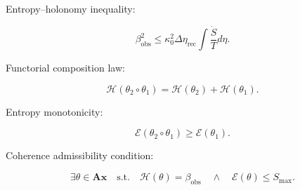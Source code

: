 \documentclass[12pt]{article}
\begin{document}
Entropy--holonomy inequality:

\begin{equation}
\beta_{\mathrm{obs}}^2
\le
\kappa_0^2
\Delta\eta_{\mathrm{rec}}
\int \frac{\dot{S}}{T} d\eta.
\end{equation}

Functorial composition law:

\begin{equation}
\mathcal{H}(\theta_2\circ\theta_1)
=
\mathcal{H}(\theta_2)
+
\mathcal{H}(\theta_1).
\end{equation}

Entropy monotonicity:

\begin{equation}
\mathcal{E}(\theta_2\circ\theta_1)
\ge
\mathcal{E}(\theta_1).
\end{equation}

Coherence admissibility condition:

\begin{equation}
\exists \theta \in \mathbf{Ax}
\quad
\text{s.t.}
\quad
\mathcal{H}(\theta)=\beta_{\mathrm{obs}}
\quad
\land
\quad
\mathcal{E}(\theta)\le S_{\mathrm{max}}.
\end{equation}
\end{document}
